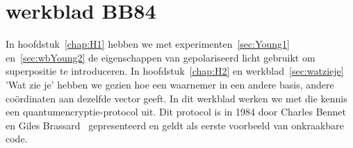 \documentclass[../../main.tex]{subfiles}
\begin{document}
\onlyinsubfile{\setcounter{chapter}{8}}
\notinsubfile{}
\section{werkblad BB84}\label{sec:wbBB84}

\iffalse
\hrefqr{https://ocw.tudelft.nl/course-lectures/6-4-1-bb84-protocol/}{stefanie wehner tudelft legt t uit} 17 min.\nogdoen{hier moet een beter filmpje voor te vinden zijn}
\fi
In hoofdstuk~\ref{chap:H1} hebben we met experimenten~\ref{sec:Young1} en~\ref{sec:wbYoung2} de eigenschappen van gepolariseerd licht gebruikt om superpositie te introduceren. In hoofdstuk~\ref{chap:H2} en werkblad~\ref{sec:watzieje} 'Wat zie je' hebben we gezien hoe een waarnemer in een andere basis, andere co\"ordinaten aan dezelfde vector geeft. In dit werkblad werken we met die kennis een quantumencryptie-protocol uit. Dit protocol is in 1984 door Charles Bennet en Giles Brassard~\citep{BENNETT20147} gepresenteerd en geldt als eerste voorbeeld van onkraakbare code.
\end{document}
